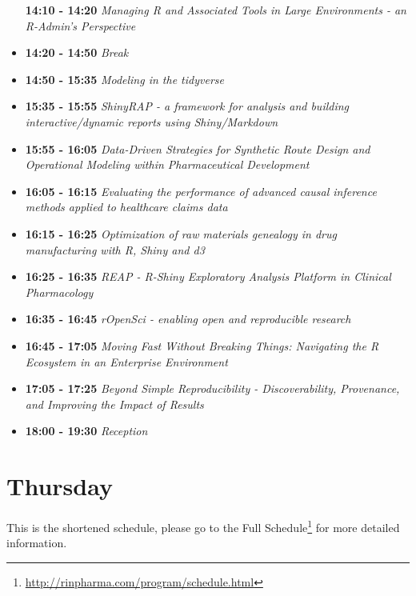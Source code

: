\documentclass[]{book}
\renewcommand{\href}[2]{#2\footnote{\url{#1}}}
\theoremstyle{definition}
\theoremstyle{definition}
\theoremstyle{definition}
\theoremstyle{remark}
\begin{document}
\begin{itemize}
  \textbf{14:10 - 14:20} \emph{Managing R and Associated Tools in Large
  Environments - an R-Admin's Perspective}
\item
  \textbf{14:20 - 14:50} \emph{Break}
\item
  \textbf{14:50 - 15:35} \emph{Modeling in the tidyverse}
\item
  \textbf{15:35 - 15:55} \emph{ShinyRAP - a framework for analysis and
  building interactive/dynamic reports using Shiny/Markdown}
\item
  \textbf{15:55 - 16:05} \emph{Data-Driven Strategies for Synthetic
  Route Design and Operational Modeling within Pharmaceutical
  Development}
\item
  \textbf{16:05 - 16:15} \emph{Evaluating the performance of advanced
  causal inference methods applied to healthcare claims data}
\item
  \textbf{16:15 - 16:25} \emph{Optimization of raw materials genealogy
  in drug manufacturing with R, Shiny and d3}
\item
  \textbf{16:25 - 16:35} \emph{REAP - R-Shiny Exploratory Analysis
  Platform in Clinical Pharmacology}
\item
  \textbf{16:35 - 16:45} \emph{rOpenSci - enabling open and reproducible
  research}
\item
  \textbf{16:45 - 17:05} \emph{Moving Fast Without Breaking Things:
  Navigating the R Ecosystem in an Enterprise Environment}
\item
  \textbf{17:05 - 17:25} \emph{Beyond Simple Reproducibility -
  Discoverability, Provenance, and Improving the Impact of Results}
\item
  \textbf{18:00 - 19:30} \emph{Reception}
\end{itemize}

\hypertarget{thursday}{%
\section{Thursday}\label{thursday}}

This is the shortened schedule, please go to
\href{http://rinpharma.com/program/schedule.html}{the Full Schedule} for
more detailed information.
\end{document}
